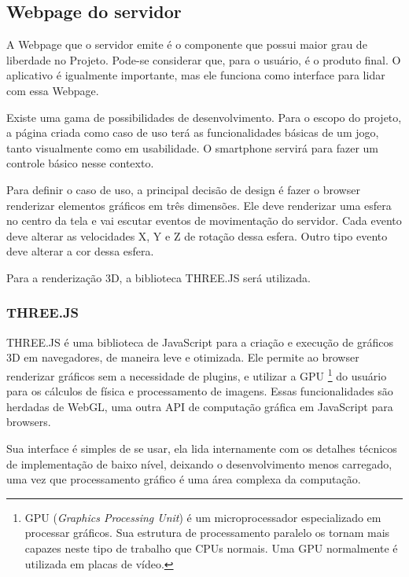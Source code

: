 \documentclass[a4paper,12pt]{article}
\begin{document}
\newpage
\subsection{Webpage do servidor}

A Webpage que o servidor emite é o componente que possui maior grau de liberdade no Projeto. Pode-se considerar que, para o usuário, é o produto final. O aplicativo é igualmente importante, mas ele funciona como interface para lidar com essa Webpage.

Existe uma gama de possibilidades de desenvolvimento. Para o escopo do projeto, a página criada como caso de uso terá as funcionalidades básicas de um jogo, tanto visualmente como em usabilidade. O smartphone servirá para fazer um controle básico nesse contexto.

Para definir o caso de uso, a principal decisão de design é fazer o browser renderizar elementos gráficos em três dimensões. Ele deve renderizar uma esfera no centro da tela e vai escutar eventos de movimentação do servidor. Cada evento deve alterar as velocidades X, Y e Z de rotação dessa esfera. Outro tipo evento deve alterar a cor dessa esfera.%


Para a renderização 3D, a biblioteca THREE.JS será utilizada.


\subsubsection{THREE.JS}

THREE.JS é uma biblioteca de JavaScript para a criação e execução de gráficos 3D em navegadores, de maneira leve e otimizada. Ele permite ao browser renderizar gráficos sem a necessidade de plugins, e utilizar a GPU \footnote{GPU (\emph{Graphics Processing Unit}) é um microprocessador especializado em processar gráficos. Sua estrutura de processamento paralelo os tornam mais capazes neste tipo de trabalho que CPUs normais. Uma GPU normalmente é utilizada em placas de vídeo.} do usuário para os cálculos de física e processamento de imagens. Essas funcionalidades são herdadas de WebGL, uma outra API de computação gráfica em JavaScript para browsers.

Sua interface é simples de se usar, ela lida internamente com os detalhes técnicos de implementação de baixo nível, deixando o desenvolvimento menos carregado, uma vez que processamento gráfico é uma área complexa da computação.
\end{document}
